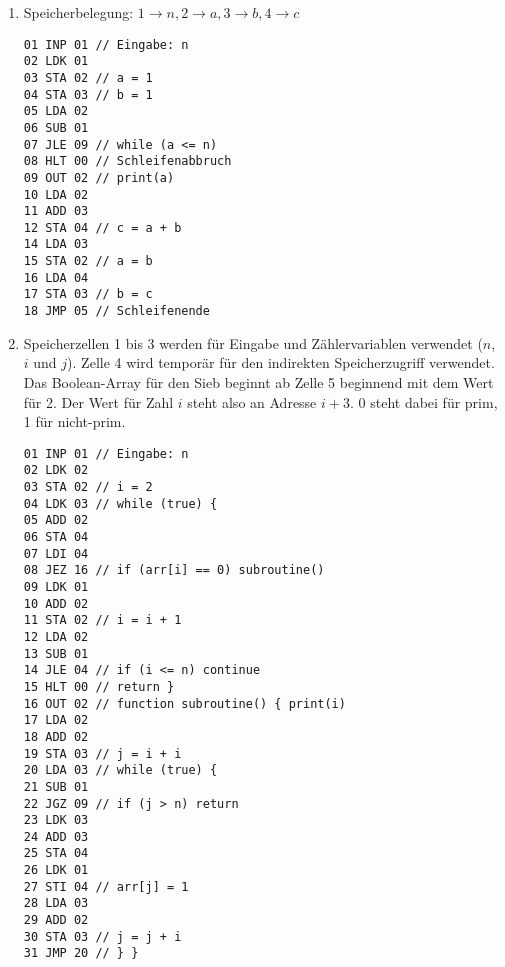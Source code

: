 \documentclass[11pt,a4paper]{article}
\begin{document}
\begin{loesung}
\begin{enumerate}[label=\alph*)]
\item Speicherbelegung: $1 \rightarrow n, 2 \rightarrow a, 3 \rightarrow b, 4 \rightarrow c$
\begin{lstlisting}
01 INP 01 // Eingabe: n
02 LDK 01
03 STA 02 // a = 1
04 STA 03 // b = 1
05 LDA 02 
06 SUB 01
07 JLE 09 // while (a <= n)
08 HLT 00 // Schleifenabbruch
09 OUT 02 // print(a)
10 LDA 02
11 ADD 03
12 STA 04 // c = a + b
14 LDA 03
15 STA 02 // a = b
16 LDA 04
17 STA 03 // b = c
18 JMP 05 // Schleifenende
\end{lstlisting}
\item Speicherzellen 1 bis 3 werden für Eingabe und Zählervariablen verwendet ($n$, $i$ und $j$).
Zelle 4 wird temporär für den indirekten Speicherzugriff verwendet.
Das \glqq{}Boolean-Array\grqq{} für den Sieb beginnt ab Zelle 5 beginnend mit dem Wert für 2. 
Der Wert für Zahl $i$ steht also an Adresse $i + 3$.
0 steht dabei für prim, 1 für nicht-prim.
\begin{lstlisting}
01 INP 01 // Eingabe: n
02 LDK 02
03 STA 02 // i = 2
04 LDK 03 // while (true) {
05 ADD 02
06 STA 04
07 LDI 04
08 JEZ 16 // if (arr[i] == 0) subroutine()
09 LDK 01
10 ADD 02
11 STA 02 // i = i + 1
12 LDA 02
13 SUB 01 
14 JLE 04 // if (i <= n) continue
15 HLT 00 // return }
16 OUT 02 // function subroutine() { print(i)
17 LDA 02
18 ADD 02
19 STA 03 // j = i + i
20 LDA 03 // while (true) {
21 SUB 01
22 JGZ 09 // if (j > n) return
23 LDK 03
24 ADD 03
25 STA 04
26 LDK 01
27 STI 04 // arr[j] = 1
28 LDA 03
29 ADD 02
30 STA 03 // j = j + i
31 JMP 20 // } }
\end{lstlisting}
\end{enumerate}
\end{loesung}
\end{document}
